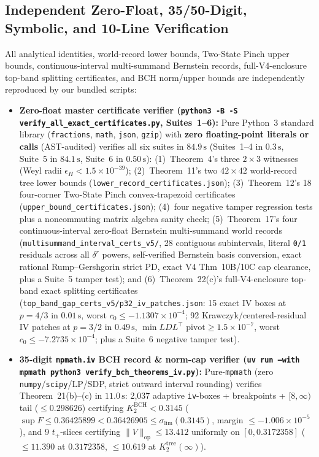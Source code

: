 \documentclass[10pt,letterpaper]{article}
\newcommand{\op}{\mathrm{op}}
\begin{document}
\subsection{Independent Zero-Float, 35/50-Digit, Symbolic, and 10-Line Verification}

All analytical identities, world-record lower bounds, Two-State Pinch upper bounds, continuous-interval multi-summand Bernstein records, full-V4-enclosure top-band splitting certificates, and BCH norm/upper bounds are independently reproduced by our bundled scripts:
\begin{itemize}[leftmargin=1.5em,itemsep=2pt]
  \item \textbf{Zero-float master certificate verifier (\texttt{python3 -B -S verify\_all\_exact\_certificates.py}, Suites~1--6):} Pure Python~3 standard library (\texttt{fractions}, \texttt{math}, \texttt{json}, \texttt{gzip}) with \textbf{zero floating-point literals or calls} (AST-audited) verifies all six suites in $84.9\,\mathrm{s}$ (Suites~1--4 in $0.3\,\mathrm{s}$, Suite~5 in $84.1\,\mathrm{s}$, Suite~6 in $0.50\,\mathrm{s}$): (1)~Theorem~4's three $2\times 3$ witnesses (Weyl radii $\epsilon_H < 1.5\times 10^{-39}$); (2)~Theorem~11's two $42\times 42$ world-record tree lower bounds (\texttt{lower\_record\_certificates.json}); (3)~Theorem~12's 18 four-corner Two-State Pinch convex-trapezoid certificates (\texttt{upper\_bound\_certificates.json}); (4)~four negative tamper regression tests plus a noncommuting matrix algebra sanity check; (5)~Theorem~17's four continuous-interval zero-float Bernstein multi-summand world records (\texttt{multisummand\_interval\_certs\_v5/}, 28 contiguous subintervals, literal \texttt{0/1} residuals across all $\delta^r$ powers, self-verified Bernstein basis conversion, exact rational Rump--Gershgorin strict PD, exact V4 Thm~10B/10C cap clearance, plus a Suite~5 tamper test); and (6)~Theorem~22(c)'s full-V4-enclosure top-band exact splitting certificates (\texttt{top\_band\_gap\_certs\_v5/\allowbreak p32\_iv\_patches.json}: 15 exact IV boxes at $p = 4/3$ in $0.01\,\mathrm{s}$, worst $c_0 \le -1.1307\times 10^{-4}$; 92 Krawczyk/centered-residual IV patches at $p = 3/2$ in $0.49\,\mathrm{s}$, $\min LDL^\top\text{ pivot} \ge 1.5\times 10^{-7}$, worst $c_0 \le -7.2735\times 10^{-4}$; plus a Suite~6 negative tamper test).
  \item \textbf{35-digit \texttt{mpmath.iv} BCH record \& norm-cap verifier (\texttt{uv run --with mpmath python3 verify\_\allowbreak bch\_\allowbreak theorems\_\allowbreak iv.py}):} Pure-\texttt{mpmath} (zero \texttt{numpy}/\texttt{scipy}/LP/SDP, strict outward interval rounding) verifies Theorem~21(b)--(c) in $11.0\,\mathrm{s}$: 2{,}037 adaptive \texttt{iv}-boxes + breakpoints + $[8,\infty)$ tail ($\le 0.298626$) certifying $K_2^{\mathrm{BCH}} < 0.3145$ ($\sup F \le 0.36425899 < 0.36426905 \le \sigma_{\lim}(0.3145)$, margin $\le -1.006\times 10^{-5}$), and 9 $t_+$-slices certifying $\|V\|_{\op} \le 13.412$ uniformly on $[0, 0.3172358]$ ($\le 11.390$ at $0.3172358$, $\le 10.619$ at $K_2^{\mathrm{tree}}(\infty)$).

\end{itemize}
\end{document}
